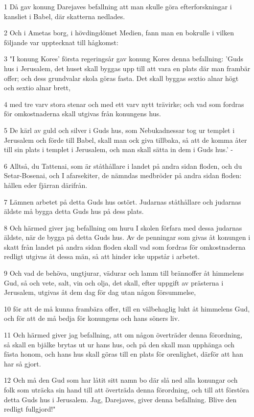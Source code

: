 \par 1 Då gav konung Darejaves befallning att man skulle göra efterforskningar i kansliet i Babel, där skatterna nedlades.
\par 2 Och i Ametas borg, i hövdingdömet Medien, fann man en bokrulle i vilken följande var upptecknat till hågkomst:
\par 3 "I konung Kores' första regeringsår gav konung Kores denna befallning: 'Guds hus i Jerusalem, det huset skall byggas upp till att vara en plats där man frambär offer; och dess grundvalar skola göras fasta. Det skall byggas sextio alnar högt och sextio alnar brett,
\par 4 med tre varv stora stenar och med ett varv nytt trävirke; och vad som fordras för omkostnaderna skall utgivas från konungens hus.
\par 5 De kärl av guld och silver i Guds hus, som Nebukadnessar tog ur templet i Jerusalem och förde till Babel, skall man ock giva tillbaka, så att de komma åter till sin plats i templet i Jerusalem, och man skall sätta in dem i Guds hus.' -
\par 6 Alltså, du Tattenai, som är ståthållare i landet på andra sidan floden, och du Setar-Bosenai, och I afarsekiter, de nämndas medbröder på andra sidan floden: hållen eder fjärran därifrån.
\par 7 Lämnen arbetet på detta Guds hus ostört. Judarnas ståthållare och judarnas äldste må bygga detta Guds hus på dess plats.
\par 8 Och härmed giver jag befallning om huru I skolen förfara med dessa judarnas äldste, när de bygga på detta Guds hus. Av de penningar som givas åt konungen i skatt från landet på andra sidan floden skall vad som fordras för omkostnaderna redligt utgivas åt dessa män, så att hinder icke uppstår i arbetet.
\par 9 Och vad de behöva, ungtjurar, vädurar och lamm till brännoffer åt himmelens Gud, så och vete, salt, vin och olja, det skall, efter uppgift av prästerna i Jerusalem, utgivas åt dem dag för dag utan någon försummelse,
\par 10 för att de må kunna frambära offer, till en välbehaglig lukt åt himmelens Gud, och för att de må bedja för konungens och hans söners liv.
\par 11 Och härmed giver jag befallning, att om någon överträder denna förordning, så skall en bjälke brytas ut ur hans hus, och på den skall man upphänga och fästa honom, och hans hus skall göras till en plats för orenlighet, därför att han har så gjort.
\par 12 Och må den Gud som har låtit sitt namn bo där slå ned alla konungar och folk som uträcka sin hand till att överträda denna förordning, och till att förstöra detta Guds hus i Jerusalem. Jag, Darejaves, giver denna befallning. Blive den redligt fullgjord!"
